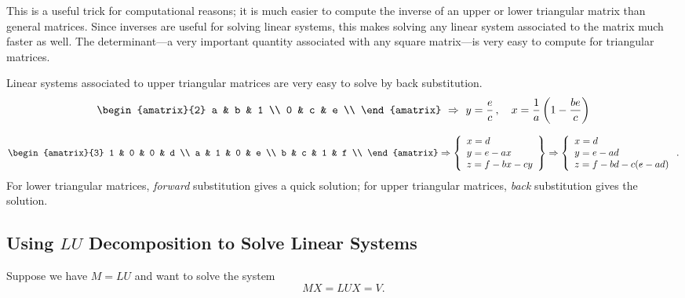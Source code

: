 This is a useful trick for  computational reasons; it is much easier to compute the inverse of an upper or lower triangular matrix than general matrices.  Since inverses are useful for solving linear systems, this makes solving any linear system associated to the matrix much faster as well.  The determinant---a very important quantity associated with any square matrix---is very easy to compute for triangular matrices.

\begin{example}
Linear systems associated to upper triangular matrices are very easy to solve by back substitution.
\[
\begin{amatrix}{2}
a & b & 1 \\
0 & c & e \\
\end{amatrix} \ \Rightarrow \ y=\frac{e}{c}\, , \quad x=\frac{1}{a}\left(1-\frac{be}{c}\right)
\]

\[
\begin{amatrix}{3}
1 & 0 & 0 & d \\
a & 1 & 0 & e \\
b & c & 1 & f \\
\end{amatrix} 
\Rightarrow 
\left\{    \begin{array}{l} x=d\\   y=e-ax\\  z=f-bx-cy \end{array} \right\}
\Rightarrow 
\left\{    \begin{array}{l} x=d\\   y=e-ad\\  z=f-bd-c(e-ad) \end{array} \right. .
\]
For lower triangular matrices, 
\emph{forward} substitution 
gives a quick solution; for upper triangular matrices, 
\emph{back} substitution 
gives the solution.
\end{example}





\subsection{Using $LU$ Decomposition to Solve Linear Systems}

Suppose we have $M=LU$ and want to solve the system
\[
MX=LUX=V.
\]

